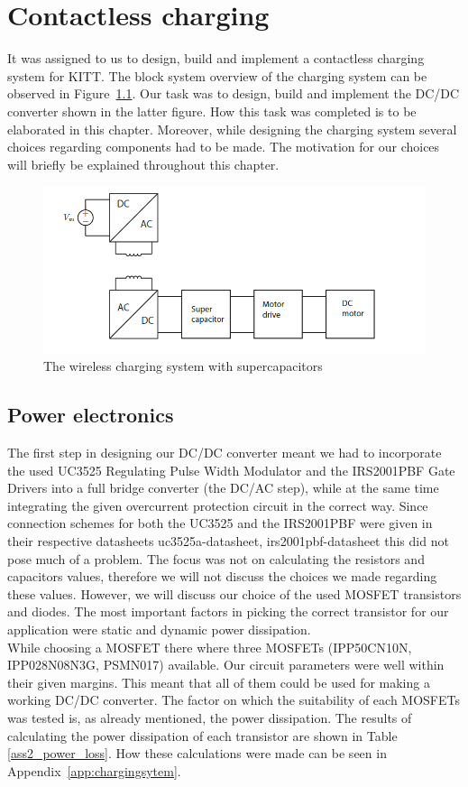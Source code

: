 \documentclass[11pt,titlepage]{report}
\begin{document}
\chapter{Contactless charging}
\label{Contactless charging}
It was assigned to us to design, build and implement a contactless charging system for KITT. The block system overview of the charging system can be observed in Figure~\ref{fig:contactless_charging}. Our task was to design, build and implement the DC/DC converter shown in the latter figure. How this task was completed is to be elaborated in this chapter. Moreover, while designing the charging system several choices regarding components had to be made. The motivation for our choices will briefly be explained throughout this chapter. \\	

\begin{figure}[H]
	\begin{center}
		\includegraphics[width=0.8\linewidth]{resource/contactless_charging.png}
	\end{center}
	\caption{The wireless charging system with supercapacitors}
	\label{fig:contactless_charging}
\end{figure}


\section{Power electronics}
The first step in designing our DC/DC converter meant we had to incorporate the used UC3525 Regulating
Pulse Width Modulator and the IRS2001PBF Gate Drivers into a full bridge converter (the
DC/AC step), while at the same time integrating the given overcurrent protection circuit in the correct
way. Since connection schemes for both the UC3525 and the IRS2001PBF were given in their respective
datasheets uc3525a-datasheet, irs2001pbf-datasheet this did not pose much of a problem. The focus
was not on calculating the resistors and capacitors values, therefore we will not discuss the choices we
made regarding these values. However, we will discuss our choice of the used MOSFET transistors and
diodes. The most important factors in picking the correct transistor for our application were static and
dynamic power dissipation. \\
While choosing a MOSFET	there where three MOSFETs (IPP50CN10N, IPP028N08N3G, PSMN017) available. Our circuit parameters were well within their given margins. This meant that all of them could be used for making a working DC/DC converter. The factor on which the suitability of each MOSFETs was tested is, as already mentioned, the power dissipation. The results of calculating the power dissipation of each transistor are shown in Table \ref{ass2_power_loss}. How these calculations were made can be seen in Appendix~\ref{app:chargingsytem}. 
\end{document}
